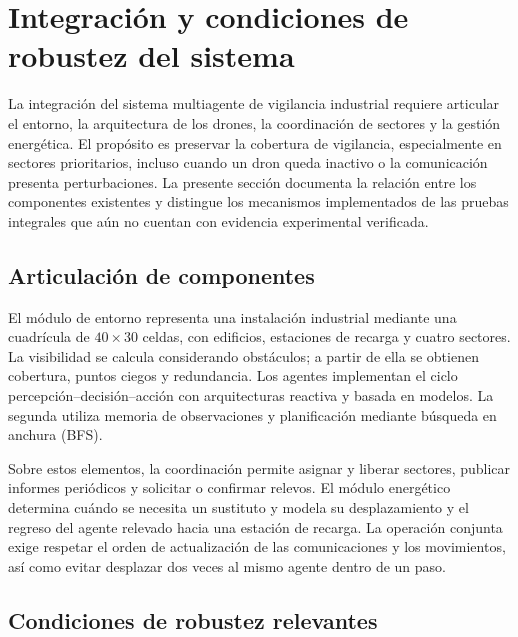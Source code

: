 \section{Integración y condiciones de robustez del sistema}

La integración del sistema multiagente de vigilancia industrial requiere articular el entorno, la arquitectura de los drones, la coordinación de sectores y la gestión energética. El propósito es preservar la cobertura de vigilancia, especialmente en sectores prioritarios, incluso cuando un dron queda inactivo o la comunicación presenta perturbaciones. La presente sección documenta la relación entre los componentes existentes y distingue los mecanismos implementados de las pruebas integrales que aún no cuentan con evidencia experimental verificada.

\subsection{Articulación de componentes}

El módulo de entorno representa una instalación industrial mediante una cuadrícula de $40\times30$ celdas, con edificios, estaciones de recarga y cuatro sectores. La visibilidad se calcula considerando obstáculos; a partir de ella se obtienen cobertura, puntos ciegos y redundancia. Los agentes implementan el ciclo percepción--decisión--acción con arquitecturas reactiva y basada en modelos. La segunda utiliza memoria de observaciones y planificación mediante búsqueda en anchura (BFS).

Sobre estos elementos, la coordinación permite asignar y liberar sectores, publicar informes periódicos y solicitar o confirmar relevos. El módulo energético determina cuándo se necesita un sustituto y modela su desplazamiento y el regreso del agente relevado hacia una estación de recarga. La operación conjunta exige respetar el orden de actualización de las comunicaciones y los movimientos, así como evitar desplazar dos veces al mismo agente dentro de un paso.

\subsection{Condiciones de robustez relevantes}

